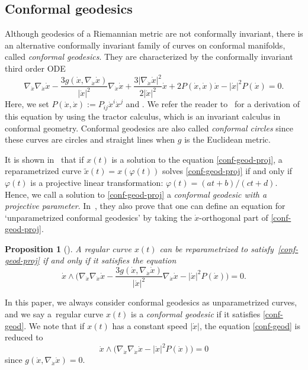 \documentclass[11pt]{article}
\numberwithin{equation}{section}
\numberwithin{equation}{section}
\newtheorem{Proposition}[Theorem]{Proposition}
 { \theoremstyle{definition}
\newtheorem{Definition}[Theorem]{Definition}
\newtheorem*{Notation}{Notation}
\newtheorem{Example}[Theorem]{Example}
\newtheorem{Remark}[Theorem]{Remark} }
\begin{document}
\subsection{Conformal geodesics}
Although geodesics of a Riemannian metric are not conformally invariant, there is an alternative conformally invariant family of curves on conformal manifolds, called {\it conformal geodesics}. They are characterized by the conformally invariant third order ODE
\begin{equation}\label{conf-geod-proj}
\nabla_{\dot x}\nabla_{\dot x}\dot x-\frac{3g(\dot x, \nabla_{\dot x}\dot x)}{|\dot x|^2}\nabla_{\dot x}\dot x+\frac{3|\nabla_{\dot x}\dot x|^2}{2|\dot x|^2}\dot x
+2P(\dot x, \dot x)\dot x-|\dot x|^2P(\dot x)=0.
\end{equation}
Here, we set $P(\dot x, \dot x):=P_{ij}\dot x^i\dot x^j$ and . We refer the reader to~\cite{BEG} for a derivation of this equation by using the tractor calculus, which is an invariant calculus in conformal geometry.
Conformal geodesics are also called {\it conformal circles} since these curves are circles and straight lines when $g$ is the Euclidean metric.

It is shown in~\cite{BE} that if $x(t)$ is a solution to the equation \eqref{conf-geod-proj}, a reparametrized curve $\tilde x(t)=x(\varphi(t))$ solves \eqref{conf-geod-proj} if and only if $\varphi(t)$ is a projective linear transformation: $\varphi(t)=(at+b)/(ct+d)$. Hence, we call a solution to \eqref{conf-geod-proj}
a {\it conformal geodesic with a projective parameter}. In~\cite{BE}, they also prove that one can define an equation for `unparametrized conformal geodesics' by taking the $\dot x$-orthogonal part of \eqref{conf-geod-proj}.
\begin{Proposition}[{\cite[Proposition 4.2]{BE}}]
A regular curve $x(t)$ can be reparametrized to satisfy~\eqref{conf-geod-proj} if and only if it satisfies the equation
\begin{equation}\label{conf-geod}
\dot x\wedge\biggl(\nabla_{\dot x}\nabla_{\dot x}\dot x-\frac{3g(\dot x, \nabla_{\dot x}\dot x)}{|\dot x|^2}\nabla_{\dot x}\dot x-|\dot x|^2P(\dot x)\biggr)=0.
\end{equation}
\end{Proposition}
In this paper, we always consider conformal geodesics as unparametrized curves, and we say a~regular curve $x(t)$ is a {\it conformal geodesic} if it satisfies \eqref{conf-geod}.
We note that if $x(t)$ has a constant speed $|\dot x|$, the equation \eqref{conf-geod} is reduced to
\begin{equation}\label{conf-geod-const-speed}
\dot x\wedge\bigl(\nabla_{\dot x}\nabla_{\dot x}\dot x-|\dot x|^2P(\dot x)\bigr)=0
\end{equation}
since $g(\dot x, \nabla_{\dot x}\dot x)=0$.
\end{document}
